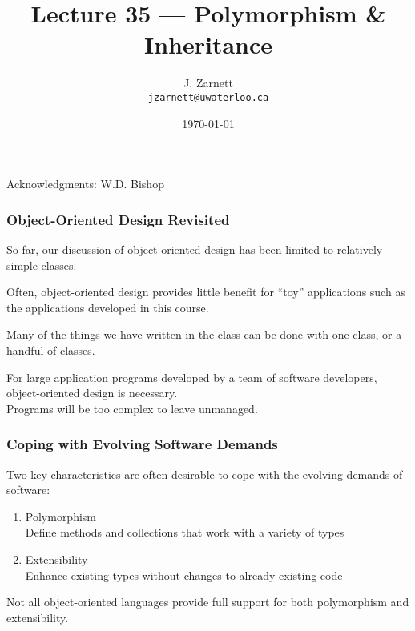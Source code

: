 

\title{Lecture 35 --- Polymorphism \& Inheritance }

\author{J. Zarnett\\
\texttt{jzarnett@uwaterloo.ca}}
\date{\today}



\begin{frame}
  \titlepage
  
  \begin{center}
  \small{Acknowledgments: W.D. Bishop}
  \end{center}
\end{frame}


\begin{frame}
\frametitle{Object-Oriented Design Revisited}

So far, our discussion of object-oriented design has been limited to relatively simple classes.

Often, object-oriented design provides little benefit for ``toy'' applications such as the applications developed in this course.

Many of the things we have written in the class can be done with one class, or a handful of classes.

For large application programs developed by a team of software developers, object-oriented design is necessary.\\
\quad Programs will be too complex to leave unmanaged.

\end{frame}

\begin{frame}
\frametitle{Coping with Evolving Software Demands}

Two key characteristics are often desirable to cope with the evolving demands of software:
\begin{enumerate}
\item \alert{Polymorphism} \\
    Define methods and collections that work with a variety of types
\item \alert{Extensibility}\\
    Enhance existing types without changes to already-existing code
\end{enumerate}

Not all object-oriented languages provide full support for both polymorphism and extensibility.

\end{frame}

